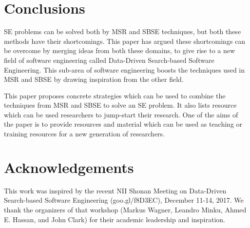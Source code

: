 \documentclass[sigconf,anonymous,review]{acmart}
\begin{document}
\section{Conclusions}
SE problems can be solved both by MSR and SBSE techniques, but both these methods have their shortcomings. This paper has argued these shortcomings can be overcome by merging ideas from both these domains, to give rise to a new field of software engineering called Data-Driven Search-based Software Engineering. This sub-area of software engineering boosts the techniques used in MSR and SBSE by drawing inspiration from the other field. 

This paper proposes concrete strategies which can be used to combine the techniques from MSR and SBSE to solve an SE problem. It also lists resource which can be used researchers to jump-start their research. One of the aims of the paper is to provide resources and material which can be used as teaching or training resources for a new generation of researchers. 

% 
% 

\section*{Acknowledgements}
This work was inspired by the recent
 NII Shonan Meeting on Data-Driven Search-based Software Engineering (goo.gl/f8D3EC), December 11-14, 2017.
We thank the organizers of that workshop 
(Markus Wagner,  
 Leandro Minku,  
 Ahmed E. Hassan, and 
 John Clark)
for their academic
leadership and inspiration.

 

 
\end{document}
